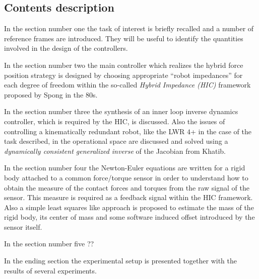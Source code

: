 \subsection*{Contents description}
In the section number one the task of interest is briefly recalled
and a number of reference frames are introduced. They will be useful
to identify the quantities involved in the design of the controllers.
\par
In the section number two the main controller which realizes the hybrid
force position strategy is designed by choosing appropriate ``robot impedances''
for each degree of freedom within the so-called \emph{Hybrid Impedance (HIC)} framework
proposed by Spong in the 80s.
\par
In the section number three the synthesis of an inner loop inverse dynamics
controller, which is required by the HIC, is discussed. Also the issues of
controlling a kinematically redundant robot, like the LWR $4$+ in the case
of the task described, in the operational space
are discussed and solved using a \emph{dynamically consistent
generalized inverse} of the Jacobian from Khatib.
\par
In the section number four the Newton-Euler equations are written for
a rigid body attached to a common force/torque sensor in order to understand
how to obtain the measure of the contact forces and torques from the raw
signal of the sensor. This measure is required as a feedback signal within the
HIC framework. Also a simple least squares like approach is proposed
to estimate the mass of the rigid body, its center of mass and some software
induced offset introduced by the sensor itself.
\par
In the section number five ??
\par
In the ending section the experimental setup is presented together with
the results of several experiments.
\newpage
